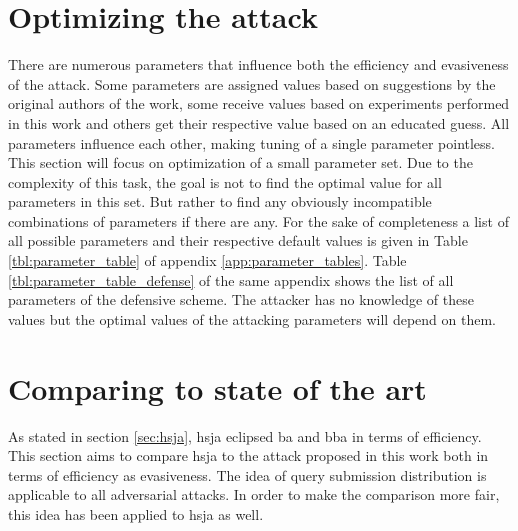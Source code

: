 \section{Optimizing the attack}\label{sec:optimize}
There are numerous parameters that influence both the efficiency and evasiveness of the attack. Some parameters are assigned values based on suggestions by the original authors of the work, some receive values based on experiments performed in this work and others get their respective value based on an educated guess. All parameters influence each other, making tuning of a single parameter pointless.\\

This section will focus on optimization of a small parameter set. Due to the complexity of this task, the goal is not to find the optimal value for all  parameters in this set. But rather to find any obviously incompatible combinations of parameters if there are any. For the sake of completeness a list of all possible parameters and their respective default values is given in Table \ref{tbl:parameter_table} of appendix \ref{app:parameter_tables}. Table \ref{tbl:parameter_table_defense} of the same appendix shows the list of all parameters of the defensive scheme. The attacker has no knowledge of these values but the optimal values of the attacking parameters will depend on them.\\

\section{Comparing to state of the art}
As stated in section \ref{sec:hsja}, \gls{hsja} \cite{hsja} eclipsed \gls{ba} and \gls{bba} in terms of efficiency. This section aims to compare \gls{hsja} to the attack proposed in this work both in terms of efficiency as evasiveness. The idea of query submission distribution is applicable to all adversarial attacks. In order to make the comparison more fair, this idea has been applied to \gls{hsja} as well.\\

